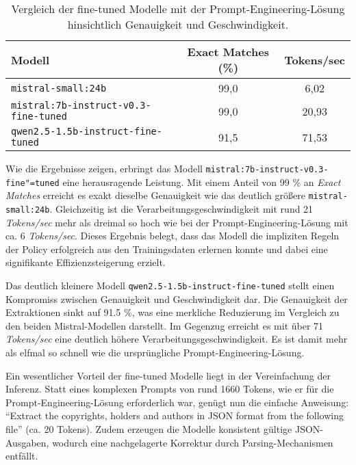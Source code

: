 \begin{table}[H]
    \centering
    \begin{tabular}{l c c}
        \hline
        \textbf{Modell} & \textbf{Exact Matches (\%)} & \textbf{Tokens/sec} \\
        \hline
        \texttt{mistral-small:24b} & 99,0 & 6,02 \\
        \texttt{mistral:7b-instruct-v0.3-fine-tuned} & 99,0 & 20,93 \\
        \texttt{qwen2.5-1.5b-instruct-fine-tuned} & 91,5 & 71,53 \\
        \hline
    \end{tabular}
    \caption{Vergleich der fine-tuned Modelle mit der Prompt-Engineering-Lösung hinsichtlich Genauigkeit und Geschwindigkeit.}
    \label{tab:modellvergleich}
\end{table}

Wie die Ergebnisse zeigen, erbringt das Modell \texttt{mistral:7b-instruct-v0.3-fine"=tuned} eine herausragende Leistung.
Mit einem Anteil von \num{99} \% an \textit{Exact Matches} erreicht es exakt dieselbe Genauigkeit wie das deutlich größere \texttt{mistral-small:24b}.
Gleichzeitig ist die Verarbeitungsgeschwindigkeit mit rund \num{21} \textit{Tokens/sec} mehr als dreimal so hoch wie bei der Prompt-Engineering-Lösung mit ca. \num{6} \textit{Tokens/sec}.
Dieses Ergebnis belegt, dass das Modell die impliziten Regeln der Policy erfolgreich aus den Trainingsdaten erlernen konnte und dabei eine signifikante Effizienzsteigerung erzielt.

Das deutlich kleinere Modell \texttt{qwen2.5-1.5b-instruct-fine-tuned} stellt einen Kompromiss zwischen Genauigkeit und Geschwindigkeit dar.
Die Genauigkeit der Extraktionen sinkt auf \num{91,5} \%, was eine merkliche Reduzierung im Vergleich zu den beiden Mistral-Modellen darstellt.
Im Gegenzug erreicht es mit über \num{71} \textit{Tokens/sec} eine deutlich höhere Verarbeitungsgeschwindigkeit.
Es ist damit mehr als elfmal so schnell wie die ursprüngliche Prompt-Engineering-Lösung.

Ein wesentlicher Vorteil der fine-tuned Modelle liegt in der Vereinfachung der Inferenz.
Statt eines komplexen Prompts von rund 1660 Tokens, wie er für die Prompt-Engineering-Lösung erforderlich war, genügt nun die einfache Anweisung: \enquote{Extract the copyrights, holders and authors in JSON format from the following file} (ca. 20 Tokens).
Zudem erzeugen die Modelle konsistent gültige JSON-Ausgaben, wodurch eine nachgelagerte Korrektur durch Parsing-Mechanismen entfällt.


